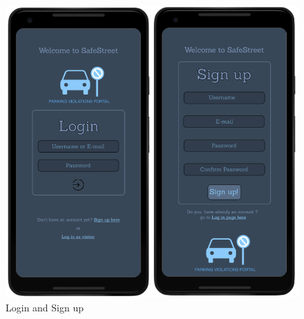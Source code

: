 \begin{figure}[h]
\centering
\includegraphics[width=\textwidth]{Images/login_signup.png}
\caption{\label{fig:ls}Login and Sign up }
\end{figure}

